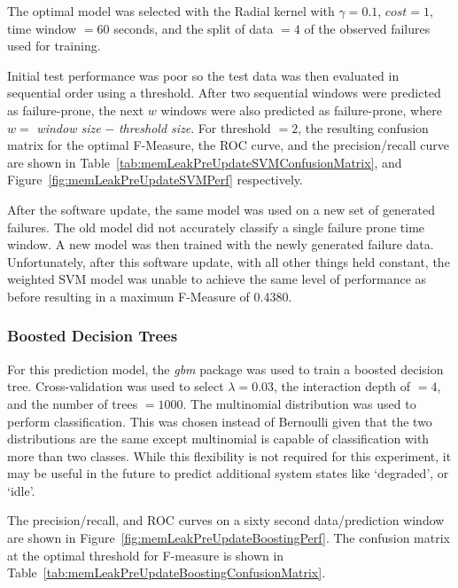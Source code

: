 The optimal model was selected with the Radial kernel with $\gamma = 0.1$,
$cost = 1$, time window $= 60$ seconds, and the split of data $= 4$ of the
observed failures used for training.

Initial test performance was poor so the test data was then evaluated in
sequential order using a threshold.  After two sequential windows were
predicted as failure-prone, the next $w$ windows were also predicted as
failure-prone, where $w = $ \emph{window size} $-$ \emph{threshold size}.  For
threshold $= 2$, the resulting confusion matrix for the optimal F-Measure, the
\ac{ROC} curve, and the precision/recall curve are shown in
Table~\ref{tab:memLeakPreUpdateSVMConfusionMatrix}, and
Figure~\ref{fig:memLeakPreUpdateSVMPerf} respectively.

\figMemLeakPreUpdateSVMPerf
\tabMemLeakPreUpdateSVMConfusionMatrix

After the software update, the same model was used on a new set of generated
failures.  The old model did not accurately classify a single failure prone
time window.  A new model was then trained with the newly generated failure
data.  Unfortunately, after this software update, with all other things held
constant, the weighted SVM model was unable to achieve the same level of
performance as before resulting in a maximum F-Measure of $0.4380$.

\subsubsection{Boosted Decision Trees}
For this prediction model, the \emph{gbm} package was used to train a boosted
decision tree.  Cross-validation was used to select $\lambda = 0.03$, the
interaction depth of $= 4$, and the number of trees $= 1000$.  The multinomial
distribution was used to perform classification.  This was chosen instead of
Bernoulli given that the two distributions are the same except multinomial is
capable of classification with more than two classes.  While this flexibility
is not required for this experiment, it may be useful in the future to predict
additional system states like `degraded', or `idle'.

The precision/recall, and \ac{ROC} curves on a sixty second data/prediction
window are shown in Figure~\ref{fig:memLeakPreUpdateBoostingPerf}.  The
confusion matrix at the optimal threshold for F-measure is shown in
Table~\ref{tab:memLeakPreUpdateBoostingConfusionMatrix}.

\figMemLeakPreUpdateBoostingPerf
\tabMemLeakPreUpdateBoostingConfusionMatrix

